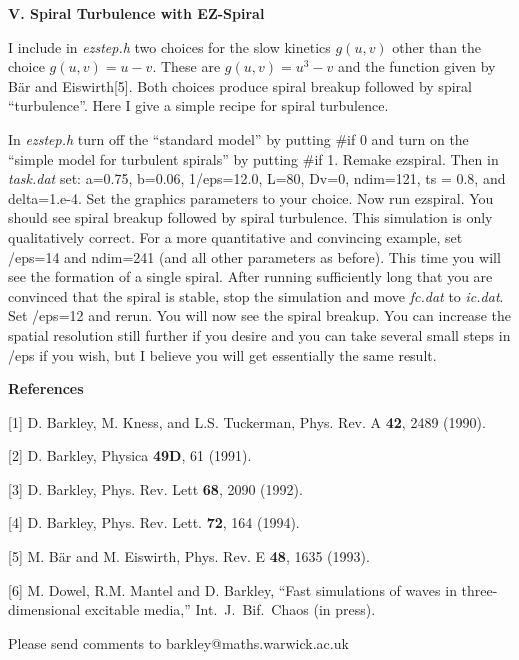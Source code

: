 {\bf V. Spiral Turbulence with EZ-Spiral} 

I include in {\em ezstep.h} two choices for the slow kinetics $g(u,v)$
other than the choice $g(u,v) = u-v$.  These are $g(u,v) = u^3-v$ and
the function given by B\"ar and Eiswirth[5].  Both choices produce
spiral breakup followed by spiral ``turbulence''.  Here I give a
simple recipe for spiral turbulence.

In {\em ezstep.h} turn off the ``standard model'' by putting {\sf \#if
0} and turn on the ``simple model for turbulent spirals'' by putting
{\sf \#if 1}.  Remake ezspiral.  Then in {\em task.dat} set: {\sf
a=0.75, b=0.06, 1/eps=12.0, L=80, Dv=0, ndim=121, ts = 0.8}, and {\sf
delta=1.e-4}.  Set the graphics parameters to your choice.  Now run
ezspiral.  You should see spiral breakup followed by spiral
turbulence. This simulation is only qualitatively correct.  For a more
quantitative and convincing example, set {/eps=14} and {\sf
ndim=241} (and all other parameters as before).  This time you will
see the formation of a single spiral.  After running sufficiently long
that you are convinced that the spiral is stable, stop the simulation
and move {\em fc.dat} to {\em ic.dat}.  Set {/eps=12} and
rerun.  You will now see the spiral breakup.  You can increase the
spatial resolution still further if you desire and you can take
several small steps in {/eps} if you wish, but I believe you will
get essentially the same result.


{\bf References} 

[1] D. Barkley, M. Kness, and L.S. Tuckerman, Phys. Rev. A {\bf 42}, 2489 (1990).

[2] D. Barkley, Physica {\bf 49D}, 61 (1991).

[3] D. Barkley, Phys. Rev. Lett {\bf 68}, 2090 (1992).

[4] D. Barkley, Phys. Rev. Lett. {\bf 72}, 164 (1994).

[5] M. B\"ar and  M. Eiswirth, Phys. Rev. E {\bf 48}, 1635 (1993).

[6] M. Dowel, R.M. Mantel and D. Barkley, ``Fast simulations of waves
in three-dimensional excitable media,'' Int.~J.~Bif.~Chaos (in press).


Please send comments to barkley@maths.warwick.ac.uk

 
